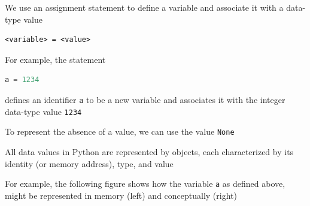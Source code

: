 \documentclass[8pt,a4paper,compress]{beamer}
\begin{document}
\begin{frame}[fragile]
\pause

We use an assignment statement to define a variable and associate it with a data-type value
\begin{lstlisting}[language={}]
<variable> = <value>
\end{lstlisting}

\pause
\bigskip

For example, the statement 
\begin{lstlisting}[language=Python]
a = 1234
\end{lstlisting}
defines an identifier \lstinline{a} to be a new variable and associates it with the integer data-type value \lstinline{1234}

\pause
\bigskip

To represent the absence of a value, we can use the value \lstinline{None}

\pause
\bigskip

All data values in Python are represented by objects, each characterized by its identity (or memory address), type, and value

\pause
\bigskip

For example, the following figure shows how the variable \lstinline{a} as defined above, might be represented in memory (left) and conceptually (right) 
\begin{center}
\end{center}
\end{frame}
\end{document}

